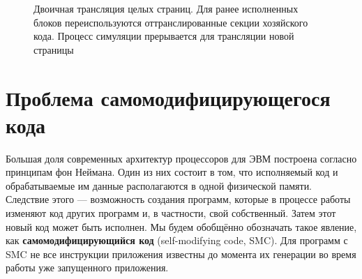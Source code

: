 \begin{figure}[htb]
    \centering
    \caption[Двоичная трансляция целых страниц]{Двоичная трансляция целых страниц. Для ранее исполненных блоков переиспользуются оттранслированные секции хозяйского кода. Процесс симуляции прерывается для трансляции новой страницы}
    \label{fig:bt-pages}
\end{figure}

% 

\section{Проблема самомодифицирующегося кода}\label{sec:smc}

Большая доля современных архитектур процессоров для ЭВМ построена согласно принципам фон Неймана. Один из них состоит в том, что исполняемый код и обрабатываемые им данные располагаются в одной физической памяти. Следствие этого --- возможность создания программ, которые в процессе работы изменяют код других программ и, в частности, свой собственный. Затем этот новый код может быть исполнен. Мы будем обобщённо обозначать такое явление, как \textbf{самомодифицирующийся код} (\abbr self-modifying code, SMC). Для программ с SMC не все инструкции приложения известны до момента их генерации во время работы уже запущенного приложения.

